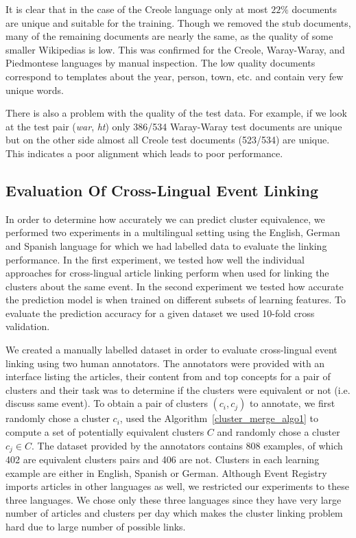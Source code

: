 \documentclass[twoside,11pt]{article}
\begin{document}
It is clear that in the case of the Creole language only at most $22\%$ documents are unique and suitable for the training. Though we removed the stub documents, many of the remaining documents are nearly the same, as the quality of some smaller Wikipedias is low. This was confirmed for the Creole, Waray-Waray, and Piedmontese languages by manual inspection. The low quality documents correspond to templates about the year, person, town, etc. and contain very few unique words.

There is also a problem with the quality of the test data. For example, if we look at the test pair (\emph{war}, \emph{ht}) only 386/534 Waray-Waray test documents are unique but on the other side almost all Creole test documents (523/534) are unique. This indicates a poor alignment which leads to poor performance.

\subsection{Evaluation Of Cross-Lingual Event Linking}
In order to determine how accurately we can predict cluster equivalence, we performed two experiments in a multilingual setting using the English, German and Spanish language for which we had labelled data to evaluate the linking performance. In the first experiment, we tested how well  the individual approaches for cross-lingual article linking perform when used for linking the clusters about the same event. In the second experiment we tested how accurate the prediction model is when trained on different subsets of learning features. To evaluate the prediction accuracy for a given dataset we used 10-fold cross validation.

We created a manually labelled dataset in order to evaluate cross-lingual event linking using two human annotators. The annotators were provided with an interface listing the articles, their content from and top concepts for a pair of clusters and their task was to determine if the clusters were equivalent or not (i.e. discuss same event). To obtain a pair of clusters $(c_i, c_j)$ to annotate, we first randomly chose a cluster $c_i$, used the Algorithm~\ref{cluster_merge_algo1} to compute a set of potentially equivalent clusters $C$ and randomly chose a cluster $c_j \in C$. The dataset provided by the annotators contains 808 examples, of which 402 are equivalent clusters pairs and 406 are not. Clusters in each learning example are either in English, Spanish or German. Although Event Registry imports articles in other languages as well, we restricted our experiments to these three languages. We chose only these three languages since they have very large number of articles and clusters per day which makes the cluster linking problem hard due to large number of possible links.
\end{document}
